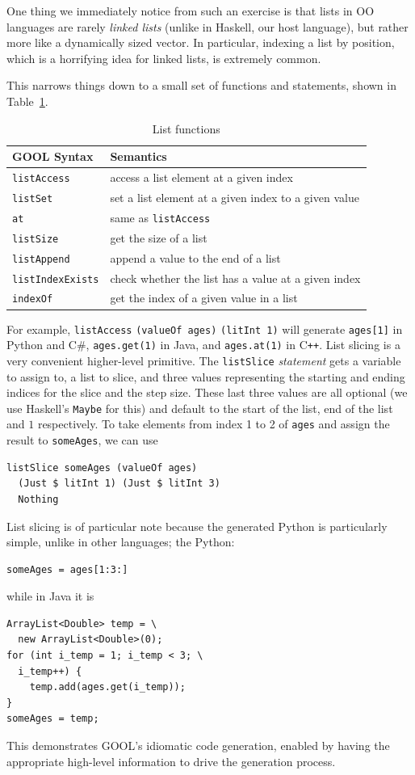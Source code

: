 \documentclass[sigplan,review,anonymous,prologue,dvipsnames]{acmart}
\newcommand{\Csharp}{C\#}
\newcommand{\Cplusplus}{C\texttt{++}}
\begin{document}
One thing we immediately notice from such an exercise is that lists in
OO languages are rarely \emph{linked lists} (unlike in Haskell, our host
language), but rather more like a dynamically sized vector. In particular,
indexing a list by position, which is a horrifying idea for linked lists,
is extremely common.

This narrows things down to a small set of functions and statements, shown in 
Table~\ref{tab:listfuncs}.
\begin{table}[b]
\caption{List functions}
\begin{tabular}{p{} p{}}
  \textbf{GOOL Syntax} & \textbf{Semantics} \\
  \midrule
  \verb|listAccess| & access a list element at a given index \\
  \verb|listSet| & set a list element at a given index to a given value \\
  \verb|at| & same as \verb|listAccess| \\
  \verb|listSize| & get the size of a list \\
  \verb|listAppend| & append a value to the end of a list \\
  \verb|listIndexExists| & check whether the list has a value at a given index 
  \\
  \verb|indexOf| & get the index of a given value in a list \\
\end{tabular}
\label{tab:listfuncs}
\end{table}
For example, \verb|listAccess| \verb|(valueOf ages)| \verb|(litInt 1)| will 
generate
\verb|ages[1]| in Python and \Csharp, \verb|ages.get(1)| in Java, and
\verb|ages.at(1)| in \Cplusplus.  List slicing is a very convenient
higher-level primitive.  The \verb|listSlice| \emph{statement} gets
a variable to assign to, a list to slice, and three
values representing the starting and ending indices for the slice and the step
size. These last three values are all optional (we use Haskell's \verb|Maybe|
for this) and default to the start of the list, end of the list and $1$
respectively.  To take elements from index 1 to 2 of \verb|ages| and
assign the result to \verb|someAges|, we can use
\begin{lstlisting}
listSlice someAges (valueOf ages)
  (Just $ litInt 1) (Just $ litInt 3)
  Nothing
\end{lstlisting}
List slicing is of particular note because the generated Python is particularly
simple, unlike in other languages; the Python:
\begin{lstlisting}
someAges = ages[1:3:]
\end{lstlisting}
while in Java it is
\begin{lstlisting}
ArrayList<Double> temp = \
  new ArrayList<Double>(0);
for (int i_temp = 1; i_temp < 3; \
  i_temp++) {
    temp.add(ages.get(i_temp));
}
someAges = temp;
\end{lstlisting}
This demonstrates GOOL's idiomatic code generation, enabled by having the
appropriate high-level information to drive the generation process.
\end{document}
